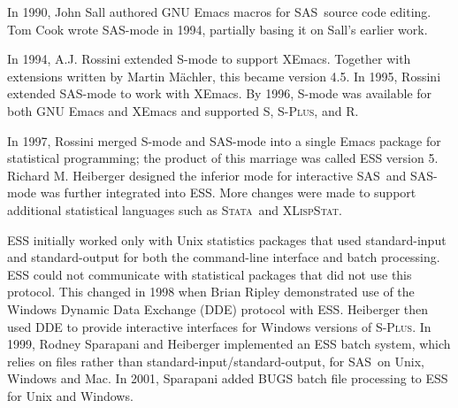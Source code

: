 \documentclass{article}
\newcommand*{\SAS}{\textsc{SAS}}
\newcommand*{\Splus}{\textsc{S-Plus}}
\newcommand*{\XLispStat}{\textsc{XLispStat}}
\newcommand*{\Stata}{\textsc{Stata}}
\newcommand{\stexttt}[1]{{\small\texttt{#1}}}
\begin{document}
In 1990, John Sall authored GNU Emacs macros for \SAS\ source code 
editing.  Tom Cook wrote SAS-mode in 1994, partially basing it on 
Sall's earlier work.  

In 1994, A.J. Rossini extended S-mode to support XEmacs.  
Together with extensions written by Martin M{\"a}chler, this
became version 4.5.  In 1995, Rossini extended SAS-mode to work with XEmacs.
By 1996, S-mode was available for both GNU Emacs and XEmacs and supported 
S, \Splus, and R.  

In 1997, Rossini merged S-mode and SAS-mode into a single Emacs package 
for statistical programming; the product of this marriage was called ESS 
version 5.
Richard M. Heiberger designed the inferior mode for interactive \SAS\
and SAS-mode was 
further integrated into ESS.  More changes were made to support
additional statistical languages such as \Stata\ and \XLispStat.

ESS initially worked only with Unix statistics packages that
used standard-input and standard-output for both the command-line 
interface and batch processing.  ESS could not communicate with 
statistical packages that did not use this protocol.  This changed in 1998 when
Brian Ripley demonstrated use of the Windows Dynamic Data Exchange (DDE)
protocol with ESS.
Heiberger then used DDE to provide interactive interfaces for Windows 
versions of \Splus.
In 1999, Rodney Sparapani and Heiberger implemented an ESS batch
system, which relies on files rather than
standard-input/standard-output, for \SAS\ on Unix, Windows and Mac.
In 2001, Sparapani added BUGS batch file processing to ESS for Unix
and Windows.
\end{document}
